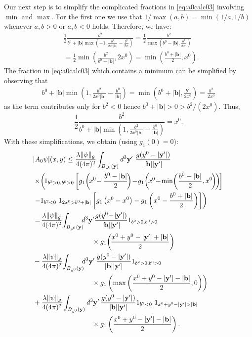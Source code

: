 \documentclass[b5paper,draft,openbib,12pt]{memoir}
\newcommand{\vy}{\mathbf{y}}
\newcommand{\vb}{\mathbf{b}}
\begin{document}
Our next step is to simplify the complicated fractions 
in \eqref{eq:a0calc03} involving $\min$ and $\max$. 
For the first one we use that 
\(1/\max(a,b)=\min(1/a,1/b)\) whenever \(a,b>0\) or 
\(a,b<0\) holds. Therefore, we have:
\begin{align}
    &\frac{1}{2}\frac{b^2}{b^0+|\vb|\max\left( -1,\frac{b^2}{2x^0|\vb|} - \frac{b^0}{|\vb|}\right)}
	= \frac{1}{2} \frac{b^2}{\max\left(b^0-|\vb|,\frac{b^2}{2x^0}\right)}\nonumber\\
    &= \frac{1}{2} \min \left(\frac{b^2}{b^0-|\vb|}, 2x^0 \right)\nonumber
    = \min \left( \frac{b^0+|\vb|}{2}, x^0 \right).
\end{align}
The fraction in \eqref{eq:a0calc03} which contains a 
minimum can be simplified by observing that
\begin{align}
    b^0+|\vb|\min\left(1,\frac{b^2}{2x^0|\vb|}-\frac{b^0}{|\vb|}\right) = \min \left( b^0+|\vb|, \frac{b^2}{2x^0} \right)= \frac{b^2}{2x^0}
\end{align}
as the term contributes only for \(b^2<0\) hence \(b^0+|\vb|>0>b^2/(2x^0)\). Thus,
\begin{equation}
	\frac{1}{2} \frac{b^2}{b^0+|\vb| \min(1, \frac{b^2}{2x^0|\vb|}-\frac{b^0}{|\vb|})} = x^0.
\end{equation}
With these simplifications, we obtain (using 
$g_1(0)=0$):
\begin{align}
    &|A_0\psi|(x,y) \le  \frac{\lambda \|\psi\|_g}{4(4\pi)^2} \int_{B_{y^0}(\vy)}d^3\vy'~ \frac{g(y^0-|\vy'|)}{|\vb||\vy'|} \nonumber\\
    &\times \!\left(\!1_{b^2>0,b^0>0} \left[g_1\!\left(\!x^0\!-\frac{b^0-|\vb|}{2} \!\right)\! -\! g_1\!\left(\! x^0 \!- \!\min\!\left(\frac{b^0+|\vb|}{2},x^0\!\right)\!\right)\!\right]\right.\nonumber\\
    &\left. -1_{b^2<0}~1_{2x^0>b^0+|\vb|}\left[
    g_1\left(x^0-x^0\right)- g_1\left(x^0-\frac{b^0+|\vb|}{2} \right)\right]\right)\nonumber\\\label{y'Integral1}
    &=\!\frac{\lambda \|\psi\|_g}{4(4\pi)^2} \!\int_{B_{y^0}(\vy)}\!\!\!d^3\vy' \frac{g(y^0\!-\!|\vy'|)}{|\vb||\vy'|}
    1_{b^2>0,b^0>0} \notag\\
    &\hspace{3cm} \times g_1\!\left(\!\frac{x^0+y^0-|\vy'|+|\vb|}{2} \right) \\\label{y'Integral2}
    &-\frac{\lambda \|\psi\|_g}{4(4\pi)^2}\! \int_{B_{y^0}(\vy)}\!\!\!d^3\vy' \, \frac{g(y^0-|\vy'|)}{|\vb||\vy'|}
    1_{b^2>0,b^0>0}\notag\\
    &\hspace{3cm} \times   g_1\left( \max\left(\frac{x^0+y^0-|\vy'|-|\vb|}{2},0\right)\right)\\\label{y'Integral3}
    & +\frac{\lambda \|\psi\|_g}{4(4\pi)^2} \int_{B_{y^0}(\vy)}d^3\vy' \, \frac{g(y^0-|\vy'|)}{|\vb||\vy'|} 1_{b^2<0}~1_{x^0+y^0-|\vy'|>|\vb|}\notag\\
    &\hspace{3cm} \times g_1\left(\frac{x^0+y^0-|\vy'|-|\vb|}{2} \right).
\end{align}
\end{document}
